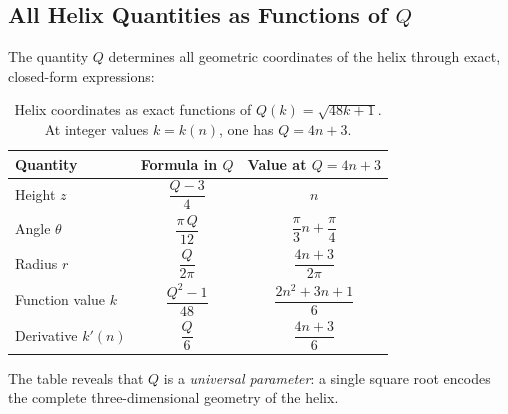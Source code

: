 \subsection{All Helix Quantities as Functions of \texorpdfstring{$Q$}{Q}}
\label{subsec:Q-table}

The quantity $Q$ determines all geometric coordinates of the helix
through exact, closed-form expressions:

\begin{table}[H]
\centering
\renewcommand{\arraystretch}{1.6}
\caption{Helix coordinates as exact functions of $Q(k) = \sqrt{48k+1}$.
  At integer values $k = k(n)$, one has $Q = 4n+3$.}
\label{tab:Q-overview}
\begin{tabular}{lcc}
\toprule
Quantity & Formula in $Q$ & Value at $Q = 4n+3$ \\
\midrule
Height $z$
  & $\dfrac{Q-3}{4}$
  & $n$ \\[8pt]
Angle $\theta$
  & $\dfrac{\pi\,Q}{12}$
  & $\dfrac{\pi}{3}n + \dfrac{\pi}{4}$ \\[8pt]
Radius $r$
  & $\dfrac{Q}{2\pi}$
  & $\dfrac{4n+3}{2\pi}$ \\[8pt]
Function value $k$
  & $\dfrac{Q^2-1}{48}$
  & $\dfrac{2n^2+3n+1}{6}$ \\[8pt]
Derivative $k'(n)$
  & $\dfrac{Q}{6}$
  & $\dfrac{4n+3}{6}$ \\
\bottomrule
\end{tabular}
\end{table}

The table reveals that $Q$ is a \emph{universal parameter}: a single
square root encodes the complete three-dimensional geometry of the helix.
